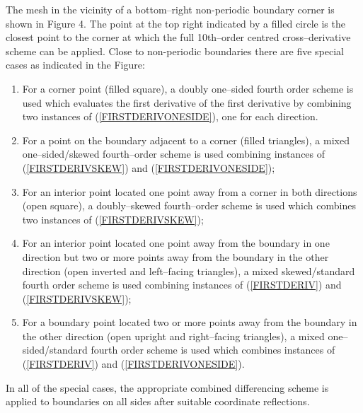 \documentclass[dvips]{article}
\begin{document}
\noindent
The mesh in the vicinity of a bottom--right non-periodic boundary corner
is shown in Figure 4.  The point at the top right indicated
by a filled circle is the closest point to the corner at which the full
10th--order centred cross--derivative scheme can be applied.
Close to non-periodic boundaries there are five special cases as
indicated in the Figure:
\begin{enumerate}
\item{For a corner point (filled square), a doubly
one--sided fourth order scheme is used which evaluates the first derivative
of the first derivative by combining two instances of
(\ref{FIRSTDERIVONESIDE}), one for each direction.}
\item{For a point on the boundary adjacent to a
corner (filled triangles), a mixed one--sided/skewed fourth--order scheme
is used combining instances of (\ref{FIRSTDERIVSKEW}) and
 (\ref{FIRSTDERIVONESIDE});}
\item{For an interior point located one point away from a corner in both
directions (open square), a doubly--skewed fourth--order scheme
is used which combines two instances of (\ref{FIRSTDERIVSKEW});}
\item{For an interior point located one point away from the boundary in
one direction but two or more points away from the boundary in the other
direction (open inverted and left--facing triangles), a mixed skewed/standard
fourth order scheme is used combining
instances of (\ref{FIRSTDERIV}) and (\ref{FIRSTDERIVSKEW});}
\item{For a boundary point located two or more points away from the boundary
in the other direction (open upright and right--facing triangles), a mixed
one--sided/standard fourth order scheme is used
which combines instances of (\ref{FIRSTDERIV}) and (\ref{FIRSTDERIVONESIDE}).}
\end{enumerate}
In all of the special cases, the appropriate combined differencing scheme is
applied to boundaries on all sides after suitable coordinate reflections.
\end{document}
